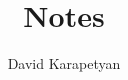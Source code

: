 \documentclass[12pt,reqno]{amsbook}
\numberwithin{section}{chapter}
\numberwithin{equation}{section}  %
\theoremstyle{remark}
\begin{document}
\title{Notes}
\author{David Karapetyan}

\date{}

\maketitle
\tableofcontents
%
%
%
%
%
%
%


%
%
%
\providecommand{\bysame}{\leavevmode\hbox to3em{\hrulefill}\thinspace}
\providecommand{\MR}{\relax\ifhmode\unskip\space\fi MR }
\providecommand{\MRhref}[2]{%
  \href{http://www.ams.org/mathscinet-getitem?mr=#1}{#2}
}
\providecommand{\href}[2]{#2}
\end{document}
